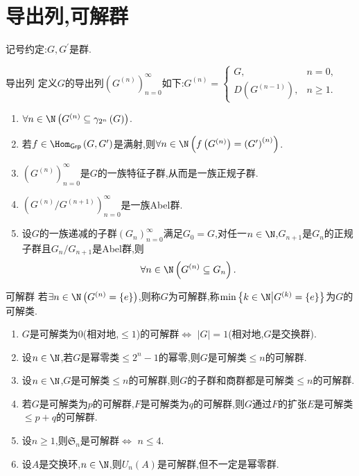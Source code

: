 \section{导出列,可解群}

记号约定:$G,G^{\prime}$是群.

\begin{definition}{导出列}{}
	定义$G$的导出列$\left(G^{\left(n\right)}\right)_{n=0}^{\infty}$如下:$G^{\left(n\right)}=
	\begin{cases}
		G,&n=0,\\
		D\left(G^{\left(n-1\right)}\right),&n\geq 1.
	\end{cases}
	$
\end{definition}

\begin{proposition}{}{}
	\begin{enumerate}
		\item $\forall n\in\N\left(G^{\left(n\right)}\subseteq\gamma_{2^{n}}\left(G\right)\right)$.
		\item 若$f\in\Hom_{\mathsf{Grp}}\left(G,G^{\prime}\right)$是满射,则$\forall n\in\N\left(f\left(G^{\left(n\right)}\right)=\left(G^{\prime}\right)^{\left(n\right)}\right)$.
		\item $\left(G^{\left(n\right)}\right)_{n=0}^{\infty}$是$G$的一族特征子群,从而是一族正规子群.
		\item $\left(G^{\left(n\right)}/G^{\left(n+1\right)}\right)_{n=0}^{\infty}$是一族Abel群.
		\item 设$G$的一族递减的子群$\left(G_{n}\right)_{n=0}^{\infty}$满足$G_{0}=G$,对任一$n\in\N$,$G_{n+1}$是$G_{n}$的正规子群且$G_{n}/G_{n+1}$是Abel群,则
		\begin{align*}
			\forall n\in\N\left(G^{\left(n\right)}\subseteq G_{n}\right).
		\end{align*}
	\end{enumerate}
\end{proposition}

\begin{definition}{可解群}{}
	若$\exists n\in\N\left(G^{\left(n\right)}=\left\{e\right\}\right)$,则称$G$为可解群,称$\min\left\{k\in\N\middle|G^{\left(k\right)}=\left\{e\right\}\right\}$为$G$的可解类.
\end{definition}

\begin{example}{}{}
	\begin{enumerate}
		\item $G$是可解类为$0$(相对地,$\leq 1$)的可解群$\iff$ $\left|G\right|=1$(相对地,$G$是交换群).
		\item 设$n\in\N$,若$G$是幂零类$\leq 2^{n}-1$的幂零,则$G$是可解类$\leq n$的可解群.
		\item 设$n\in\N$,$G$是可解类$\leq n$的可解群,则$G$的子群和商群都是可解类$\leq n$的可解群.
		\item 若$G$是可解类为$p$的可解群,$F$是可解类为$q$的可解群,则$G$通过$F$的扩张$E$是可解类$\leq p+q$的可解群.
		\item 设$n\geq 1$,则$\mathfrak{S}_{n}$是可解群$\iff$ $n\leq 4$.
		\item 设$A$是交换环,$n\in\N$,则$U_{n}\left(A\right)$是可解群,但不一定是幂零群.
	\end{enumerate}
\end{example}

